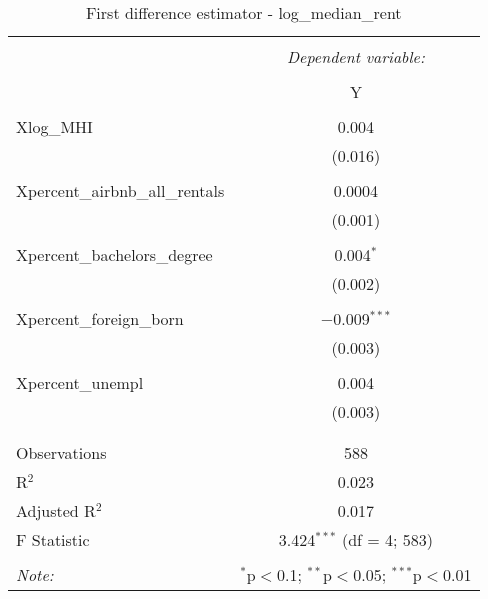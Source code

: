 \documentclass{article}
\begin{document}
\begin{table}[!htbp] \centering 
  \caption{First difference estimator - log\_median\_rent} 
  \label{} 
  \begin{tabular}{@{\extracolsep{5pt}}lc} 
    \\[-1.8ex]\hline 
    \hline \\[-1.8ex] 
    & \multicolumn{1}{c}{\textit{Dependent variable:}} \\ 
    \cline{2-2} 
    \\[-1.8ex] & Y \\ 
    \hline \\[-1.8ex] 
    Xlog\_MHI & 0.004 \\ 
    & (0.016) \\ 
    & \\ 
    Xpercent\_airbnb\_all\_rentals & 0.0004 \\ 
    & (0.001) \\ 
    & \\ 
    Xpercent\_bachelors\_degree & 0.004$^{*}$ \\ 
    & (0.002) \\ 
    & \\ 
    Xpercent\_foreign\_born & $-$0.009$^{***}$ \\ 
    & (0.003) \\ 
    & \\ 
    Xpercent\_unempl & 0.004 \\ 
    & (0.003) \\ 
    & \\ 
    \hline \\[-1.8ex] 
    Observations & 588 \\ 
    R$^{2}$ & 0.023 \\ 
    Adjusted R$^{2}$ & 0.017 \\ 
    F Statistic & 3.424$^{***}$ (df = 4; 583) \\ 
    \hline 
    \hline \\[-1.8ex] 
    \textit{Note:}  & \multicolumn{1}{r}{$^{*}$p$<$0.1; $^{**}$p$<$0.05; $^{***}$p$<$0.01} \\ 
  \end{tabular} 
\end{table} 
\end{document}
